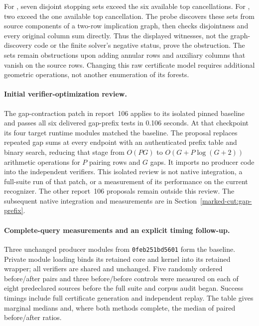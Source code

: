 For , seven disjoint stopping sets exceed
the six available top cancellations. For ,
two exceed the one available top cancellation. The probe discovers these
sets from source components of a two-row implication graph, then checks
disjointness and every original column sum directly. Thus the displayed
witnesses, not the graph-discovery code or the finite solver's negative
status, prove the obstruction. The sets remain obstructions upon adding
annular rows and auxiliary columns that vanish on the source rows. Changing
this raw certificate model requires additional geometric operations, not
another enumeration of its forests.

\paragraph{Initial verifier-optimization review.}
The gap-contraction patch in report~106 applies to its isolated pinned
baseline and passes all six delivered gap-prefix tests in 0.106 seconds.
At that checkpoint its four target runtime modules matched the baseline. The proposal
replaces repeated gap sums at every endpoint with an authenticated prefix
table and binary search, reducing that stage from $O(PG)$ to
$O(G+P\log(G+2))$ arithmetic operations for $P$ pairing rows and $G$ gaps.
It imports no producer code into the independent verifiers. This isolated
review is not native integration, a full-suite run of that patch, or a
measurement of its performance on the current recognizer. The other
report~106 proposals remain outside this review. The subsequent native
integration and measurements are in Section~\ref{marked-cut:gap-prefix}.

\paragraph{Complete-query measurements and an explicit timing follow-up.}
Three unchanged producer modules from \texttt{0feb251bd5601} form the
baseline. Private module loading binds its retained core and kernel into
its retained wrapper; all verifiers are shared and unchanged. Five
randomly ordered before/after pairs and three before/before controls were
measured on each of eight predeclared sources before the full suite and
corpus audit began. Success timings include full certificate generation
and independent replay. The table gives marginal medians and, where both
methods complete, the median of paired before/after ratios.

